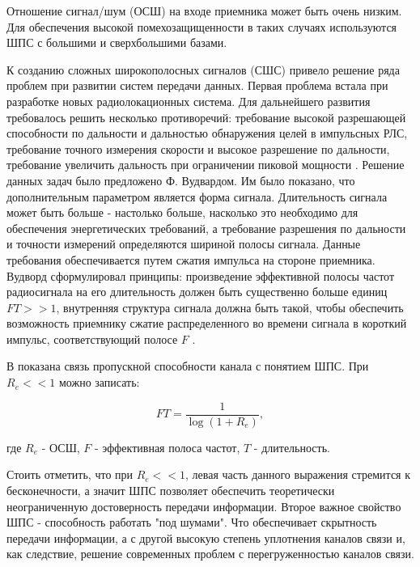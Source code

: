 Отношение сигнал/шум (ОСШ) на входе приемника может быть очень низким. Для обеспечения высокой помехозащищенности 
в таких случаях используются ШПС с большими и сверхбольшими базами.

К созданию сложных широкополосных сигналов (СШС) привело решение ряда проблем при развитии систем передачи данных.
Первая проблема встала при разработке новых радиолокационных система. Для дальнейшего развития требовалось
решить несколько противоречий: требование высокой разрешающей способности по дальности и дальностью обнаружения
целей в импульсных РЛС, требование точного измерения скорости и высокое разрешение по дальности, требование
увеличить дальность при ограничении пиковой мощности \cite{gantmaher-book}. Решение данных задач было предложено
Ф. Вудвардом. Им было показано, что дополнительным параметром является форма сигнала. Длительность сигнала
может быть больше - настолько больше, насколько это необходимо для обеспечения энергетических требований, а требование
разрешения по дальности и точности измерений определяются шириной полосы сигнала. Данные требования обеспечивается
путем сжатия импульса на стороне приемника. Вудворд сформулировал принципы: произведение эффективной полосы частот
радиосигнала на его длительность должен быть существенно больше единиц ${FT>>1}$, внутренняя структура сигнала
должна быть такой, чтобы обеспечить возможность приемнику сжатие распределенного во времени сигнала в короткий импульс,
соответствующий полосе ${F}$ \cite{gantmaher-book}.

В \cite{gantmaher-book} показана связь пропускной способности канала с понятием ШПС. При ${R_e<<1}$ можно записать:
\begin{center}
\begin{equation}
	FT = \frac{1}{\log(1+R_e)}, \nonumber
\end{equation}
\end{center}
где ${R_e}$ - ОСШ, ${F}$ - эффективная полоса частот, ${T}$ - длительность.

Стоить отметить, что при ${R_e<<1}$, левая часть данного выражения стремится к бесконечности, а значит
ШПС позволяет обеспечить теоретически неограниченную достоверность передачи информации. Второе важное свойство
ШПС - способность работать "под шумами". Что обеспечивает скрытность
передачи информации, а с другой высокую степень уплотнения каналов связи и, как следствие, решение современных проблем
с перегруженностью каналов связи.

